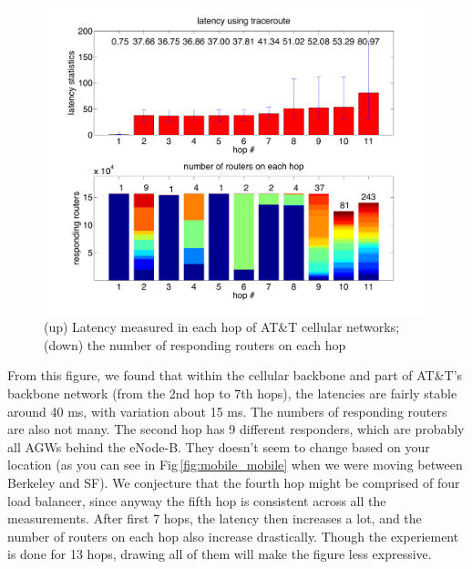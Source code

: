 \begin{figure}
  \centering
  \includegraphics[width=\linewidth]{../figs/mobile_latency.pdf}
  \vspace{-1em}
  \caption{(up) Latency measured in each hop of AT\&T cellular networks; (down) the number of responding routers on each hop}
  \label{fig:mobile_latency}
\end{figure}

From this figure, we found that within the cellular backbone and part of AT\&T's backbone network (from the 2nd hop to 7th hops), the latencies are fairly stable around 40 ms, with variation about 15 ms. The numbers of responding routers are also not many. The second hop has 9 different responders, which are probably all AGWs behind the eNode-B. They doesn't seem to change based on your location (as you can see in Fig\,\ref{fig:mobile_mobile} when we were moving between Berkeley and SF). We conjecture that the fourth hop might be comprised of four load balancer, since anyway the fifth hop is consistent across all the measurements. After first 7 hops, the latency then increases a lot, and the number of routers on each hop also increase drastically. Though the experiement is done for 13 hops, drawing all of them will make the figure less expressive.

